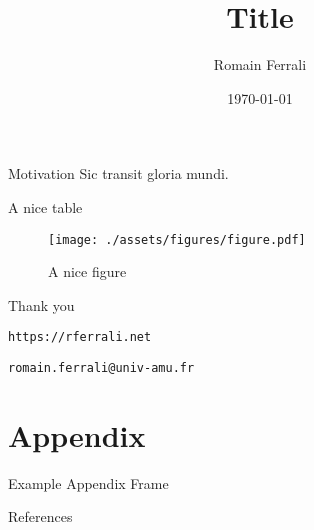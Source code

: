\documentclass[aspectratio=169,10pt]{beamer}
\title{Title}
\author{Romain Ferrali}
\institute{Aix-Marseille School of Economics}
\date{\today}
\begin{document}
\maketitle

\begin{frame}{Motivation}
  \hypertarget{starting_page}{}
  Sic transit gloria mundi. \cite{Ferrali}
  \hyperlink{appendix}{}
\end{frame}

\begin{frame}[plain]
  \begin{table}[H]
    \centering
    \footnotesize
    
    \caption{A nice table}
    \label{tab:nice_table}
  \end{table}
\end{frame}

\begin{frame}[plain]
  \begin{figure}
    \centering
    \texttt{[image: ./assets/figures/figure.pdf]}
    \caption{A nice figure}
    \label{fig:nice_figure}
  \end{figure}
\end{frame}

\begin{frame}[standout]
  \Large{Thank you}
  \vspace{1em}

  \small{{\tt https://rferrali.net}}

  \small{{\tt romain.ferrali@univ-amu.fr}}
\end{frame}

\appendix
\section{Appendix}

\begin{frame}{Example Appendix Frame}
  \hypertarget{appendix}{}
  \hyperlink{starting_page}{}
\end{frame}

\begin{frame}[allowframebreaks]{References}
  \tiny
  \begingroup
  \renewcommand{\section}[2]{} %
  \endgroup
\end{frame}
\end{document}
